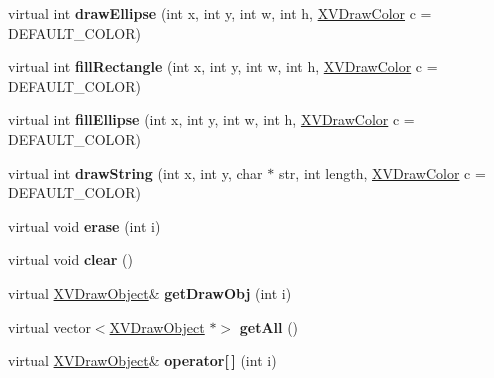\begin{CompactItemize}
\item 
\label{XVStateWindowX_a7}
\hypertarget{class_XVStateWindowX_a7}{
virtual int {\bf draw\-Ellipse} (int x, int y, int w, int h, \hyperlink{class_XVDrawColor}{XVDraw\-Color} c = DEFAULT\_\-COLOR)}

\item 
\label{XVStateWindowX_a8}
\hypertarget{class_XVStateWindowX_a8}{
virtual int {\bf fill\-Rectangle} (int x, int y, int w, int h, \hyperlink{class_XVDrawColor}{XVDraw\-Color} c = DEFAULT\_\-COLOR)}

\item 
\label{XVStateWindowX_a9}
\hypertarget{class_XVStateWindowX_a9}{
virtual int {\bf fill\-Ellipse} (int x, int y, int w, int h, \hyperlink{class_XVDrawColor}{XVDraw\-Color} c = DEFAULT\_\-COLOR)}

\item 
\label{XVStateWindowX_a10}
\hypertarget{class_XVStateWindowX_a10}{
virtual int {\bf draw\-String} (int x, int y, char $\ast$ str, int length, \hyperlink{class_XVDrawColor}{XVDraw\-Color} c = DEFAULT\_\-COLOR)}

\item 
\label{XVStateWindowX_a11}
\hypertarget{class_XVStateWindowX_a11}{
virtual void {\bf erase} (int i)}

\item 
\label{XVStateWindowX_a12}
\hypertarget{class_XVStateWindowX_a12}{
virtual void {\bf clear} ()}

\item 
virtual \hyperlink{class_XVDrawObject}{XVDraw\-Object}\& {\bf get\-Draw\-Obj} (int i)
\item 
virtual vector$<$\hyperlink{class_XVDrawObject}{XVDraw\-Object} $\ast$$>$ {\bf get\-All} ()
\item 
virtual \hyperlink{class_XVDrawObject}{XVDraw\-Object}\& {\bf operator\mbox{[}$\,$\mbox{]}} (int i)
\end{CompactItemize}
